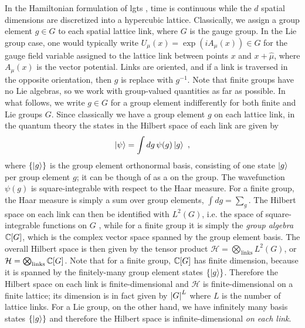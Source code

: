 In the Hamiltonian formulation of \ac{lgt}s \cite{KogSuss, Osborne, ZoharBurrello}, time is continuous while the $d$ spatial dimensions are discretized into a hypercubic lattice.
Classically, we assign a group element $g \in G$ to each spatial lattice link, where $G$ is the gauge group.
In the Lie group case, one would typically write $U_\mu(x) = \exp{(iA_\mu(x))} \in G$ for the gauge field variable assigned to the lattice link between points $x$ and $x + \hat{\mu}$, where $A_\mu(x)$ is the vector potential.
Links are oriented, and if a link is traversed in the opposite orientation, then $g$ is replace with $g^{-1}$.
Note that finite groups have no Lie algebras, so we work with group-valued quantities as far as possible.
In what follows, we write $g \in G$ for a group element indifferently for both finite and Lie groups $G$.
Since classically we have a group element $g$ on each lattice link, in the quantum theory the states in the Hilbert space of each link are given by \cite{Osborne}
\begin{equation}
    \ket{\psi}=\int dg \, \psi(g)\ket{g} \ ,
\end{equation}
where $\{\ket{g}\}$ is the group element orthonormal basis, consisting of one state $\ket{g}$ per group element $g$; it can be though of as a  on the group.
The wavefunction $\psi(g)$ is square-integrable with respect to the Haar measure.
For a finite group, the Haar measure is simply a sum over group elements, $\int dg = \sum_g$.
The Hilbert space on each link can then be identified with $L^2(G)$, i.e. the space of square-integrable functions on $G$ \cite{Osborne}, while for a finite group it is simply the \textit{group algebra} $\mathbb{C}[G]$, which is the complex vector space spanned by the group element basis.
The overall Hilbert space is then given by the tensor product $\mathcal{H} = \bigotimes_{\mathrm{links}} L^2(G)$, or $\mathcal{H} = \bigotimes_{\mathrm{links}} \mathbb{C}[G]$.
Note that for a finite group, $\mathbb{C}[G]$ has finite dimension, because it is spanned by the finitely-many group element states $\{\ket{g}\}$.
Therefore the Hilbert space on each link is finite-dimensional and $\mathcal{H}$ is finite-dimensional on a finite lattice; its dimension is in fact given by $\abs{G}^L$ where $L$ is the number of lattice links.
For a Lie group, on the other hand, we have infinitely many basis states $\{\ket{g}\}$ and therefore the Hilbert space is infinite-dimensional \textit{on each link}.

